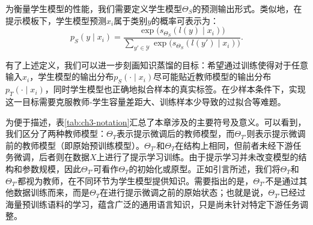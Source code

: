 \documentclass[../main.tex]{subfiles}
\begin{document}
为衡量学生模型的性能，我们需要定义学生模型$\Theta_S$的预测输出形式。类似地，在提示模板下，学生模型预测$x_i$属于类别$y$的概率可表示为：
\begin{equation}
	\label{eq:student-prob}
	p_{S}(y \mid x_i) = \frac{\exp\big(s_{\Theta_S}(l(y)\mid x_i)\big)}{\displaystyle\sum_{y' \in \mathcal{Y}} \exp\big(s_{\Theta_S}(l(y')\mid x_i)\big)} .
\end{equation}

有了上述定义，我们可以进一步刻画知识蒸馏的目标：希望通过训练使得对于任意输入$x_i$，学生模型的输出分布$p_S(\cdot \mid x_i)$尽可能贴近教师模型的输出分布$p_T(\cdot \mid x_i)$，同时学生模型也正确地拟合样本的真实标签。在少样本条件下，实现这一目标需要克服教师-学生容量差距大、训练样本少导致的过拟合等难题。

为便于描述，表\ref{tab:ch3-notation}汇总了本章涉及的主要符号及意义。可以看到，我们区分了两种教师模型：$\Theta_T$表示提示微调后的教师模型，而$\Theta_{T'}$则表示提示微调前的教师模型（即原始预训练模型）。$\Theta_{T'}$和$\Theta_T$在结构上相同，但前者未经下游任务微调，后者则在数据$X$上进行了提示学习训练。由于提示学习并未改变模型的结构和参数规模，因此$\Theta_{T'}$可看作$\Theta_T$的初始化或原型。正如引言所述，我们将$\Theta_T$和$\Theta_{T'}$都视为教师，在不同环节为学生模型提供知识。需要指出的是，$\Theta_{T'}$不是通过其他数据训练而来，而是$\Theta_T$在进行提示微调之前的原始状态；也就是说，$\Theta_{T'}$已经过海量预训练语料的学习，蕴含广泛的通用语言知识，只是尚未针对特定下游任务调整。
\end{document}
